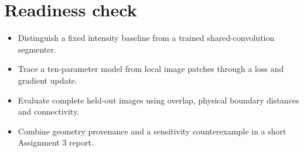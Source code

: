 \documentclass[11pt,letterpaper]{article}
\theoremstyle{definition}\newtheorem{definition}{Definition}\newtheorem{example}{Example}
\numberwithin{equation}{section}
\begin{document}
\section*{Readiness check}
\begin{itemize}
\item Distinguish a fixed intensity baseline from a trained shared-convolution segmenter.
\item Trace a ten-parameter model from local image patches through a loss and gradient update.
\item Evaluate complete held-out images using overlap, physical boundary distances and connectivity.
\item Combine geometry provenance and a sensitivity counterexample in a short Assignment 3 report.
\end{itemize}
\end{document}
